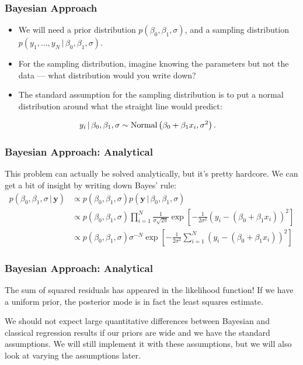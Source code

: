 \documentclass{beamer}
\newcommand{\given}{\,|\,}
\begin{document}
\begin{frame}
\frametitle{Bayesian Approach}

\begin{itemize}
\item We will need a prior distribution $p(\beta_0, \beta_1, \sigma)$,
and a sampling distribution $p(y_1, ..., y_N \given \beta_0, \beta_1, \sigma)$.\pause
\item For the sampling distribution, imagine knowing the parameters but not
the data --- what distribution would you write down?\pause
\item The standard assumption for the sampling distribution is
to put a normal distribution around what the straight line would predict:
\end{itemize}
\begin{align}
y_i \given \beta_0, \beta_1, \sigma &\sim \textnormal{Normal}
    \left(\beta_0 + \beta_1 x_i, \sigma^2\right).
\end{align}


\end{frame}


\begin{frame}
\frametitle{Bayesian Approach: Analytical}
This problem can actually be solved analytically, but it's pretty hardcore.
We can get a bit of insight by writing down Bayes' rule:
\begin{align}
p(\beta_0, \beta_1, \sigma \given \boldsymbol{y})
    &\propto p(\beta_0, \beta_1, \sigma)p(\boldsymbol{y} \given \beta_0, \beta_1, \sigma)\\
    &\propto p(\beta_0, \beta_1, \sigma)
        \prod_{i=1}^N \frac{1}{\sigma\sqrt{2\pi}}
            \exp\left[-\frac{1}{2\sigma^2}\left(y_i - (\beta_0 + \beta_1 x_i)\right)^2\right] \\
    &\propto p(\beta_0, \beta_1, \sigma)
        \sigma^{-N}
            \exp\left[-\frac{1}{2\sigma^2}\sum_{i=1}^N\left(y_i - (\beta_0 + \beta_1 x_i)\right)^2\right]
\end{align}

\end{frame}




\begin{frame}
\frametitle{Bayesian Approach: Analytical}
The sum of squared residuals has appeared in the likelihood function!
If we have a uniform prior, the posterior mode is in fact the least squares
estimate.\pause

We should not expect large quantitative differences between Bayesian and
classical regression results if our priors are wide and we have the standard
assumptions. We will still implement it with these assumptions, but we will
also look at varying the assumptions later.
\end{frame}
\end{document}
